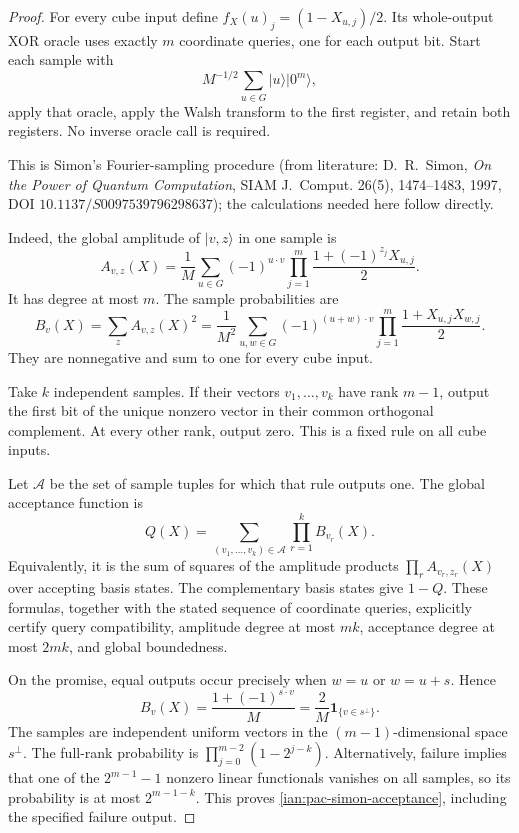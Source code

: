 \begin{proof}
For every cube input define
\(f_X(u)_j=(1-X_{u,j})/2\).
Its whole-output XOR oracle uses exactly \(m\) coordinate queries,
one for each output bit. Start each sample with
\[
 M^{-1/2}\sum_{u\in G}|u\rangle|0^m\rangle,
\]
apply that oracle, apply the Walsh transform to the first
register, and retain both registers. No inverse oracle call is
required.

This is Simon's Fourier-sampling procedure (from literature:
D.~R.~Simon, \emph{On the Power of Quantum Computation},
SIAM J.~Comput. 26(5), 1474--1483, 1997,
DOI \(10.1137/S0097539796298637\)); the calculations needed here
follow directly.

Indeed, the global amplitude of \(|v,z\rangle\) in one sample is
\[
 A_{v,z}(X)=\frac1M\sum_{u\in G}(-1)^{u\cdot v}
       \prod_{j=1}^m\frac{1+(-1)^{z_j}X_{u,j}}2.
 \tag{32.23}
\]
It has degree at most \(m\).
The sample probabilities are
\[
 B_v(X)=\sum_z A_{v,z}(X)^2
 =\frac1{M^2}\sum_{u,w\in G}(-1)^{(u+w)\cdot v}
       \prod_{j=1}^m\frac{1+X_{u,j}X_{w,j}}2.
 \tag{32.24}
\]
They are nonnegative and sum to one for every cube input.

Take \(k\) independent samples. If their vectors
\(v_1,\ldots,v_k\) have rank \(m-1\), output the first bit of the
unique nonzero vector in their common orthogonal complement.
At every other rank, output zero.
This is a fixed rule on all cube inputs.

Let \(\mathcal A\) be the set of sample tuples for which that rule
outputs one. The global acceptance function is
\[
 Q(X)=\sum_{(v_1,\ldots,v_k)\in\mathcal A}
          \prod_{r=1}^k B_{v_r}(X).
 \tag{32.25}
\]
Equivalently, it is the sum of squares of the amplitude products
\(\prod_r A_{v_r,z_r}(X)\) over accepting basis states.
The complementary basis states give \(1-Q\).
These formulas, together with the stated sequence of coordinate
queries, explicitly certify query compatibility, amplitude degree
at most \(mk\), acceptance degree at most \(2mk\), and global
boundedness.

On the promise, equal outputs occur precisely when
\(w=u\) or \(w=u+s\). Hence
\[
 B_v(X)=\frac{1+(-1)^{s\cdot v}}M
       =\frac2M\mathbf1_{\{v\in s^\perp\}}.
\]
The samples are independent uniform vectors in the
\((m-1)\)-dimensional space \(s^\perp\).
The full-rank probability is
\(\prod_{j=0}^{m-2}(1-2^{j-k})\).
Alternatively, failure implies that one of the
\(2^{m-1}-1\) nonzero linear functionals vanishes on all samples,
so its probability is at most \(2^{m-1-k}\).
This proves \eqref{ian:pac-simon-acceptance}, including the
specified failure output.


\end{proof}
